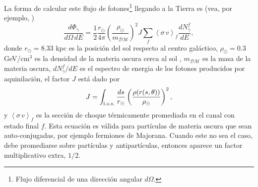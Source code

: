 La forma de calcular este flujo de fotones\footnote{Flujo diferencial de una dirección angular $d\Omega$.} llegando a la Tierra es (vea, por ejemplo, \cite{Cirelli:2010xx,Queiroz:2016awc,Slatyer:2021qgc})
\begin{equation}
\frac{d\Phi_{\gamma}}{d\Omega \, dE} = \frac{1}{2} \frac{r_\odot}{4\pi} \left( \frac{\rho_\odot}{m_\mathcal{DM}} \right)^2 J \sum_f \left< \sigma \, v \right>_f \frac{dN_\gamma^f}{dE},
\end{equation}
donde $r_\odot=8.33$ kpc es la posición del sol respecto al centro galáctico, $\rho_\odot=0.3$ GeV/cm$^3$ es la densidad de la materia oscura cerca al sol \cite{gillessen2009monitoring}, $m_\mathcal{DM}$ es la masa de la materia oscura, $dN_\gamma^f/dE$ es el espectro de energia de los fotones producidos por aquinilación, el factor $J$ está dado por
\begin{equation}
J = \int_{\rm l.o.s.} \frac{ds}{r_\odot} \left( \frac{\rho (r(s,\theta))}{\rho_\odot} \right)^2,
\end{equation}
y $\left< \sigma \, v \right>_f$ es la sección de choque térmicamente promediada en el canal con estado final $f$. Esta ecuación es válida para partículas de materia oscura que sean auto-conjugadas, por ejemplo fermiones de Majorana. Cuando este no sea el caso, debe promediarse sobre partículas y antipartículas, entonces aparece un factor multiplicativo extra, $1/2$.








